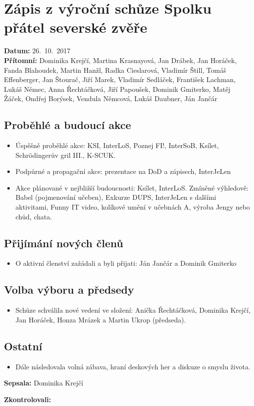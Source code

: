 \documentclass[11pt,a4paper]{article}
\begin{document}
\section*{Zápis z výroční schůze Spolku přátel severské zvěře}
\textbf{Datum:} 26.~10.~2017\\
\textbf{Přítomní:} Dominika Krejčí, Martina Krasnayová, Jan Drábek, Jan Horáček, Fanda Blahoudek, Martin Hanžl, Radka Cieslarová, Vladimír Štill, Tomáš Effenberger, Jan Štourač, Jiří Marek, Vladimír Sedláček,  František Lachman, Lukáš Němec, Anna Řechtáčková, Jiří Papoušek, Dominik Gmiterko, Matěj Žáček, Ondřej Borýsek, Vendula Němcová, Lukáš Daubner, Ján Jančár

\subsection*{Proběhlé a budoucí akce}
\begin{itemize}[itemsep=0pt]
\item Úspěšně proběhlé akce: KSI, InterLoS, Poznej FI!, InterSoB, Ksílet, Schrödingerův gril III., K-SCUK.
\item Podpůrné a propagační akce: prezentace na DoD a zápisech, InterJeLen
\item Akce plánované v nejbližší budoucnosti: Ksílet, InterLoS. Zmíněné výhledově: Babel (pojmenování učeben), Exkurze DUPS, InterJeLen s dalšími aktivitami, Funny IT video, kolíkové umění v učebnách A, výroba Jengy nebo chůd, chata.
\end{itemize}

\subsection*{Přijímání nových členů}
\begin{itemize}[itemsep=0pt]
\item O aktivní členství zažádali a byli přijati: Ján Jančár a Dominik Gmiterko
\end{itemize}

\subsection*{Volba výboru a předsedy}
\begin{itemize}[itemsep=0pt]
\item Schůze schválila nové vedení ve složení: Anička Řechtáčková, Dominika Krejčí, Jan Horáček, Honza Mrázek a Martin Ukrop (předseda).
\end{itemize}

\subsection*{Ostatní}
\begin{itemize}[itemsep=0pt]
\item Dále následovala volná zábava, hraní deskových her a diskuze o smyslu života.
\end{itemize}

\textbf{Sepsala:} Dominika Krejčí

\textbf{Zkontrolovali:}
\end{document}
